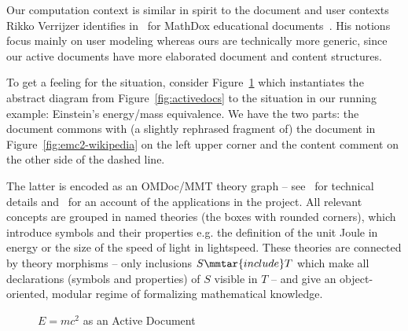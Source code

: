 Our computation context is similar in spirit to the document and user contexts Rikko
Verrijzer identifies in~\cite{Verrijzer:cimdpm15} for MathDox educational
documents~\cite{mathdox:on}. His notions focus mainly on user modeling whereas ours are
technically more generic, since our active documents have more elaborated document and
content structures.

To get a feeling for the situation, consider Figure~\ref{fig:emc-adp} which instantiates
the abstract diagram from Figure~\ref{fig:activedocs} to the situation in our running
example: Einstein's energy/mass equivalence. We have the two parts: the document commons
with (a slightly rephrased fragment of) the document in Figure~\ref{fig:emc2-wikipedia}
on the left upper corner and the content comment on the other side of the dashed line.

The latter is encoded as an OMDoc/MMT theory graph -- see~\cite{RabKoh:WSMSML13} for
technical details and~\cite{DehKohKon:iop16,ODK-D6.2} for an account of the applications
in the \pn project. All relevant concepts are grouped in named theories (the boxes with
rounded corners), which introduce symbols and their properties e.g. the definition of the
unit Joule in \textsf{energy} or the size of the speed of light in
\textsf{lightspeed}. These theories are connected by theory morphisms -- only inclusions
$S\mmtar{include}T$ which make all declarations (symbols and properties) of $S$ visible in
$T$ -- and give an object-oriented, modular regime of formalizing mathematical knowledge.

\begin{figure}\centering
  {\footnotesize}
  \caption{$E=mc^2$ as an Active Document}\label{fig:emc-adp}
\end{figure}

